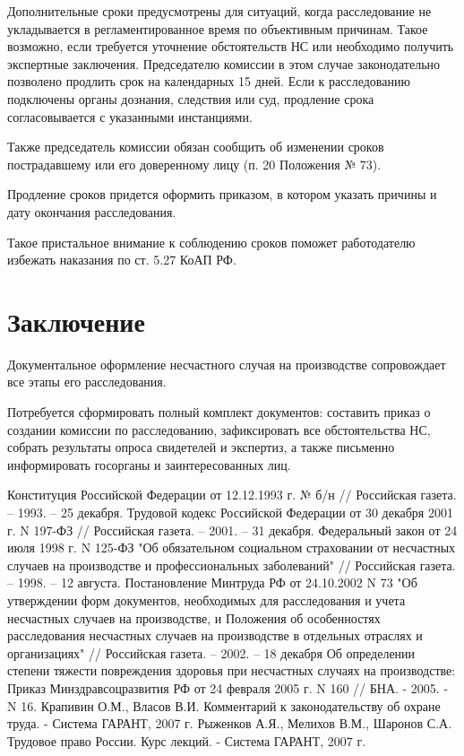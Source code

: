 Дополнительные сроки предусмотрены для ситуаций, когда расследование не укладывается в регламентированное время по объективным причинам. Такое возможно, если требуется уточнение обстоятельств НС или необходимо получить экспертные заключения. Председателю комиссии в этом случае законодательно позволено продлить срок на календарных 15 дней. Если к расследованию подключены органы дознания, следствия или суд, продление срока согласовывается с указанными инстанциями.


Также председатель комиссии обязан сообщить об изменении сроков пострадавшему или его доверенному лицу (п. 20 Положения № 73).


Продление сроков придется оформить приказом, в котором указать причины и дату окончания расследования.


Такое пристальное внимание к соблюдению сроков поможет работодателю избежать наказания по ст.  5.27 КоАП РФ.






\section{Заключение}




Документальное оформление несчастного случая на производстве сопровождает все этапы его расследования.


Потребуется сформировать полный комплект документов: составить приказ о создании комиссии по расследованию, зафиксировать все обстоятельства НС, собрать результаты опроса свидетелей и экспертиз, а также письменно информировать госорганы и заинтересованных лиц.

\begin{thebibliography}{7}
    Конституция Российской Федерации от 12.12.1993 г. № б/н // Российская газета. – 1993. – 25 декабря.
    Трудовой кодекс Российской Федерации от 30 декабря 2001 г. N 197-ФЗ // Российская газета. – 2001. – 31 декабря.
    Федеральный закон от 24 июля 1998 г. N 125-ФЗ "Об обязательном социальном страховании от несчастных случаев на производстве и профессиональных заболеваний" // Российская газета. – 1998. – 12 августа.
    Постановление Минтруда РФ от 24.10.2002 N 73 "Об утверждении форм документов, необходимых для расследования и учета несчастных случаев на производстве, и Положения об особенностях расследования несчастных случаев на производстве в отдельных отраслях и организациях" // Российская газета. – 2002. – 18 декабря
    Об определении степени тяжести повреждения здоровья при несчастных случаях на производстве: Приказ Минздравсоцразвития РФ от 24 февраля 2005 г. N 160 // БНА. - 2005. - N 16.
    Крапивин О.М., Власов В.И. Комментарий к законодательству об охране труда. - Система ГАРАНТ, 2007 г.
    Рыженков А.Я., Мелихов В.М., Шаронов С.А. Трудовое право России. Курс лекций. - Система ГАРАНТ, 2007 г.
\end{thebibliography}
